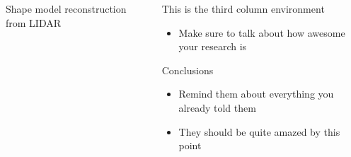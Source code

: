 \documentclass[final, usenames, dvipsnames]{beamer}
\newlength{\onecolwidth}
\newlength{\twocolwidth}
\begin{document}
\begin{frame}[t]
\begin{columns}[T,onlytextwidth]
\begin{column}{\twocolwidth}
\begin{block}{Shape model reconstruction from LIDAR}
\begin{figure}[htbp]
\end{figure}
    
\vspace{2cm}
\end{block} %
\end{column}


\begin{column}{\onecolwidth} %

\begin{block}{This is the third column environment} %
	\begin{itemize}
		\item Make sure to talk about how awesome your research is
	\end{itemize}
\end{block} %

\begin{block}{Conclusions} %
	\begin{itemize}
		\item Remind them about everything you already told them
		\item They should be quite amazed by this point
	\end{itemize}
\end{block} %
\end{column}  %

\end{columns} %
\end{frame} %
\end{document}
